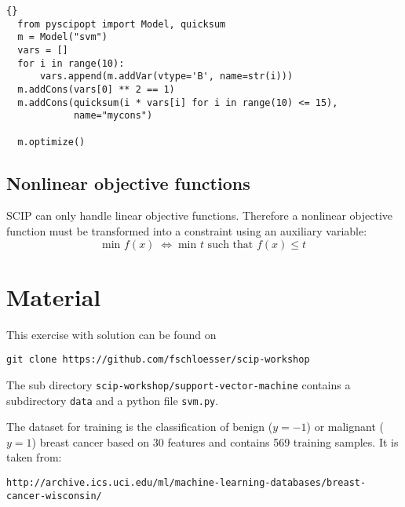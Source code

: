 \documentclass[12pt]{article}
\newcommand\ttt\texttt
\begin{document}
\begin{lstlisting}[frame=tb]{}
  from pyscipopt import Model, quicksum
  m = Model("svm")
  vars = []
  for i in range(10):
      vars.append(m.addVar(vtype='B', name=str(i)))
  m.addCons(vars[0] ** 2 == 1)
  m.addCons(quicksum(i * vars[i] for i in range(10) <= 15),
            name="mycons")

  m.optimize()
\end{lstlisting}

\subsection*{Nonlinear objective functions}
SCIP can only handle linear objective functions.
Therefore a nonlinear objective function must be transformed into a constraint using an auxiliary variable:
$$ \text{min } f(x) \; \Leftrightarrow \; \text{min } t \text{ such that } f(x) \leq t $$



\section*{Material}

This exercise with solution can be found on
\begin{center}
  \ttt{git clone https://github.com/fschloesser/scip-workshop}
\end{center}

The sub directory \ttt{scip-workshop/support-vector-machine} contains a subdirectory \ttt{data} and a python file \ttt{svm.py}.

The dataset for training is the classification of benign ($y=-1$) or malignant ($y=1$) breast cancer based on 30 features and contains 569 training samples.
It is taken from:

\begin{center}
  \ttt{\footnotesize http://archive.ics.uci.edu/ml/machine-learning-databases/breast-cancer-wisconsin/}
\end{center}
\end{document}
